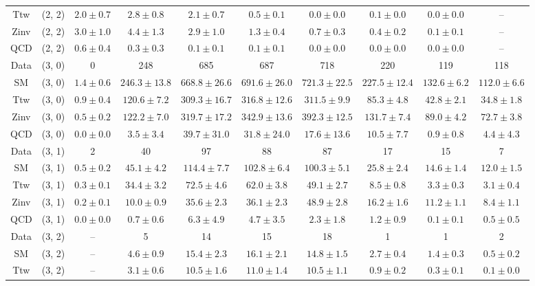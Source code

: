 \begin{table}[h!]
{\begin{tabular}{cccccccccc}
	Ttw & (2, 2) & $2.0\pm 0.7$ & $2.8\pm 0.8$ & $2.1\pm 0.7$ & $0.5\pm 0.1$ & $0.0\pm 0.0$ & $0.1\pm 0.0$ & $0.0\pm 0.0$ & -- \\[0.5ex] 
	Zinv & (2, 2) & $3.0\pm 1.0$ & $4.4\pm 1.3$ & $2.9\pm 1.0$ & $1.3\pm 0.4$ & $0.7\pm 0.3$ & $0.4\pm 0.2$ & $0.1\pm 0.1$ & -- \\[0.5ex] 
	QCD & (2, 2) & $0.6\pm 0.4$ & $0.3\pm 0.3$ & $0.1\pm 0.1$ & $0.1\pm 0.1$ & $0.0\pm 0.0$ & $0.0\pm 0.0$ & $0.0\pm 0.0$ & -- \\[0.5ex] 
	Data & (3, 0) & 0 & 248 & 685 & 687 & 718 & 220 & 119 & 118 \\[0.5ex] 
	SM & (3, 0) & $1.4\pm 0.6$ & $246.3\pm 13.8$ & $668.8\pm 26.6$ & $691.6\pm 26.0$ & $721.3\pm 22.5$ & $227.5\pm 12.4$ & $132.6\pm 6.2$ & $112.0\pm 6.6$ \\[0.5ex] 
	Ttw & (3, 0) & $0.9\pm 0.4$ & $120.6\pm 7.2$ & $309.3\pm 16.7$ & $316.8\pm 12.6$ & $311.5\pm 9.9$ & $85.3\pm 4.8$ & $42.8\pm 2.1$ & $34.8\pm 1.8$ \\[0.5ex] 
	Zinv & (3, 0) & $0.5\pm 0.2$ & $122.2\pm 7.0$ & $319.7\pm 17.2$ & $342.9\pm 13.6$ & $392.3\pm 12.5$ & $131.7\pm 7.4$ & $89.0\pm 4.2$ & $72.7\pm 3.8$ \\[0.5ex] 
	QCD & (3, 0) & $0.0\pm 0.0$ & $3.5\pm 3.4$ & $39.7\pm 31.0$ & $31.8\pm 24.0$ & $17.6\pm 13.6$ & $10.5\pm 7.7$ & $0.9\pm 0.8$ & $4.4\pm 4.3$ \\[0.5ex] 
	Data & (3, 1) & 2 & 40 & 97 & 88 & 87 & 17 & 15 & 7 \\[0.5ex] 
	SM & (3, 1) & $0.5\pm 0.2$ & $45.1\pm 4.2$ & $114.4\pm 7.7$ & $102.8\pm 6.4$ & $100.3\pm 5.1$ & $25.8\pm 2.4$ & $14.6\pm 1.4$ & $12.0\pm 1.5$ \\[0.5ex] 
	Ttw & (3, 1) & $0.3\pm 0.1$ & $34.4\pm 3.2$ & $72.5\pm 4.6$ & $62.0\pm 3.8$ & $49.1\pm 2.7$ & $8.5\pm 0.8$ & $3.3\pm 0.3$ & $3.1\pm 0.4$ \\[0.5ex] 
	Zinv & (3, 1) & $0.2\pm 0.1$ & $10.0\pm 0.9$ & $35.6\pm 2.3$ & $36.1\pm 2.3$ & $48.9\pm 2.8$ & $16.2\pm 1.6$ & $11.2\pm 1.1$ & $8.4\pm 1.1$ \\[0.5ex] 
	QCD & (3, 1) & $0.0\pm 0.0$ & $0.7\pm 0.6$ & $6.3\pm 4.9$ & $4.7\pm 3.5$ & $2.3\pm 1.8$ & $1.2\pm 0.9$ & $0.1\pm 0.1$ & $0.5\pm 0.5$ \\[0.5ex] 
	Data & (3, 2) & -- & 5 & 14 & 15 & 18 & 1 & 1 & 2 \\[0.5ex] 
	SM & (3, 2) & -- & $4.6\pm 0.9$ & $15.4\pm 2.3$ & $16.1\pm 2.1$ & $14.8\pm 1.5$ & $2.7\pm 0.4$ & $1.4\pm 0.3$ & $0.5\pm 0.2$ \\[0.5ex] 
	Ttw & (3, 2) & -- & $3.1\pm 0.6$ & $10.5\pm 1.6$ & $11.0\pm 1.4$ & $10.5\pm 1.1$ & $0.9\pm 0.2$ & $0.3\pm 0.1$ & $0.1\pm 0.0$ \\[0.5ex] 

\end{tabular}}
\end{table}
